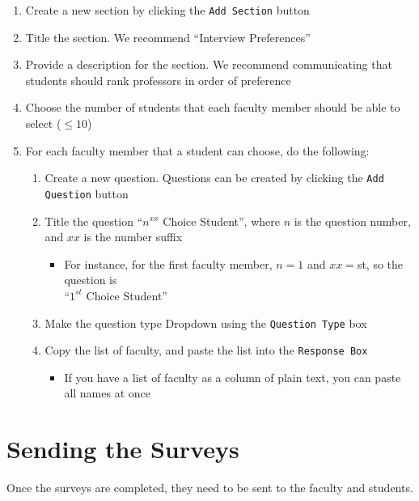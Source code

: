 \begin{enumerate}
		
	\item Create a new section by clicking the \texttt{Add Section} button
	\item Title the section.  We recommend ``Interview Preferences''
	\item Provide a description for the section.  We recommend communicating that students should rank professors in order of preference
	\item Choose the number of students that each faculty member should be able to select ($\le 10$)
	\item For each faculty member that a student can choose, do the following:
		\begin{enumerate}
			\item Create a new question. Questions can be created by clicking the \texttt{Add Question} button
			\item Title the question ``$n^{xx}$ Choice Student'', where $n$ is the question number, and $xx$ is the number suffix
				\begin{itemize}
					\item For instance, for the first faculty member, $n=1$ and $xx=$st, so the question is\\ ``$1^{st}$ Choice Student''
				\end{itemize}
			\item Make the question type Dropdown using the \texttt{Question Type} box
			\item Copy the list of faculty, and paste the list into the \texttt{Response Box}
				\begin{itemize}
					\item If you have a list of faculty as a column of plain text, you can paste all names at once
				\end{itemize}
		\end{enumerate}

\end{enumerate}


%
%
\section{Sending the Surveys}

Once the surveys are completed, they need to be sent to the faculty and students.

